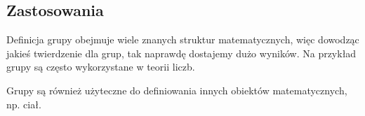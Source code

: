 \subsection{Zastosowania}

Definicja grupy obejmuje wiele znanych struktur matematycznych, więc dowodząc jakieś twierdzenie dla grup, tak naprawdę dostajemy dużo wyników. Na przykład grupy są często wykorzystane w teorii liczb.

Grupy są również użyteczne do definiowania innych obiektów matematycznych, np. ciał.
